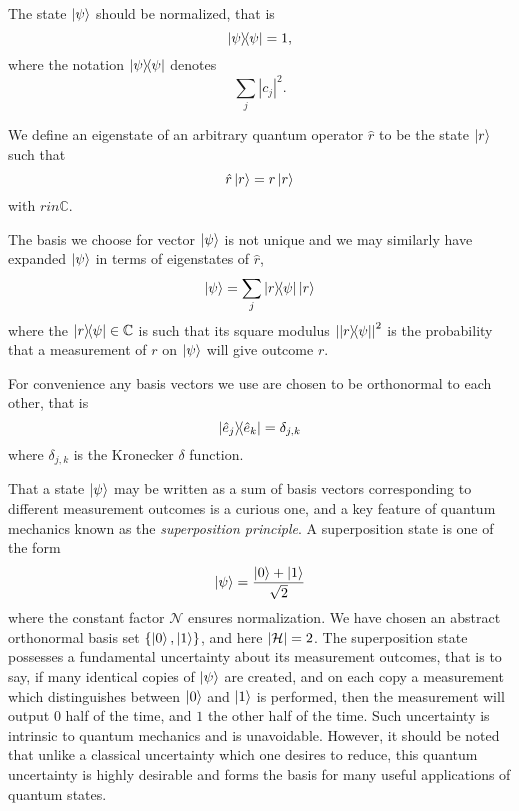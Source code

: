 The state $\ket{\psi}$ should be normalized, that is
\begin{equation}
\dyad{\psi} = 1,
\end{equation}
where the notation $\dyad{\psi}$ denotes 
\begin{equation}
\sum_j \left|c_j\right|^2.
\end{equation}

\noindent We define an eigenstate of an arbitrary quantum operator $\hat{r}$ to be the state $\ket{r}$ such that
\begin{equation}
\hat{r} \ket{r} = r \ket{r}
\end{equation}
with $r in \mathbb{C}$.

The basis we choose for vector $\ket{\psi}$ is not unique and we may similarly have expanded $\ket{\psi}$ in terms of eigenstates of $\hat{r}$,
\begin{equation}
\ket{\psi} = \sum_j \dyad{r}{\psi} \ket{r}
\end{equation}
where the $\dyad{r}{\psi} \in \mathbb{C}$ is such that its square modulus $\left|\dyad{r}{\psi}\right|^2$ is the probability that a measurement of $r$ on $\ket{\psi}$ will give outcome $r$.

For convenience any basis vectors we use are chosen to be orthonormal to each other, that is
\begin{equation}
\dyad{\hat{e}_j}{\hat{e}_k} = \delta_{j, k}
\end{equation}
where $\delta_{j, k}$ is the Kronecker $\delta$ function.

That a state $\ket{\psi}$ may be written as a sum of basis vectors corresponding to different measurement outcomes is a curious one, and a key feature of quantum mechanics known as the \emph{superposition principle}. A superposition state is one of the form
\begin{equation}\label{eqn:intro_superposition}
\ket{\psi} = \frac{\ket{0} + \ket{1}}{\sqrt{2}}
\end{equation}
where the constant factor $\mathcal{N}$ ensures normalization. We have chosen an abstract orthonormal basis set $\left\{ \ket{0}, \ket{1}\right\}$, and here $\left|\mathcal{H}\right|=2$. The superposition state possesses a fundamental uncertainty about its measurement outcomes, that is to say, if many identical copies of $\ket{\psi}$ are created, and on each copy a measurement which distinguishes between $\ket{0}$ and $\ket{1}$ is performed, then the measurement will output $0$ half of the time, and $1$ the other half of the time. Such uncertainty is intrinsic to quantum mechanics and is unavoidable. However, it should be noted that unlike a classical uncertainty which one desires to reduce, this quantum uncertainty is highly desirable and forms the basis for many useful applications of quantum states.

